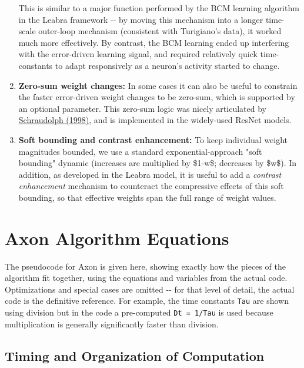 \documentclass[11pt,twoside]{article}
\newif\myifpdf
\begin{document}
\begin{enumerate}
This is similar to a major function performed by the BCM learning algorithm in the Leabra framework -\/- by moving this mechanism into a longer time-scale outer-loop mechanism (consistent with Turigiano's data), it worked much more effectively. By contrast, the BCM learning ended up interfering with the error-driven learning signal, and required relatively quick time-constants to adapt responsively as a neuron's activity started to change.

\item \textbf{Zero-sum weight changes:} In some cases it can also be useful
to constrain the faster error-driven weight changes to be zero-sum, which is supported by an optional parameter. This zero-sum logic was nicely articulated by \protect\hyperlink{references}{Schraudolph (1998)}, and is implemented in the widely-used ResNet models.

\item \textbf{Soft bounding and contrast enhancement:} To keep individual weight magnitudes bounded, we use a standard exponential-approach "soft bounding" dynamic (increases are multiplied by \$1-w\$; decreases by \$w\$). In addition, as developed in the Leabra model, it is useful to add a \emph{contrast enhancement} mechanism to counteract the compressive effects of this soft bounding, so that effective weights span the full range of weight values.

\end{enumerate}

\section{Axon Algorithm Equations}

The pseudocode for Axon is given here, showing exactly how the pieces of
the algorithm fit together, using the equations and variables from the
actual code. Optimizations and special cases are omitted -\/- for that
level of detail, the actual code is the definitive reference. For
example, the time constants \texttt{Tau} are shown using division but in
the code a pre-computed \texttt{Dt\ =\ 1/Tau} is used because
multiplication is generally significantly faster than division.

\hypertarget{timing-and-organization-of-computation}{%
\subsection{Timing and Organization of
Computation}\label{timing-and-organization-of-computation}}
\end{document}
